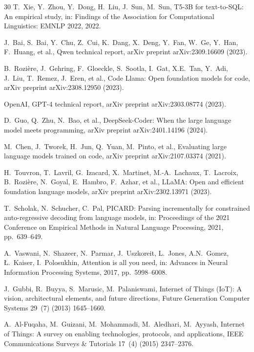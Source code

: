 \documentclass[preprint,12pt,a4paper]{elsarticle}
\begin{document}
\begin{thebibliography}{30}
T.~Xie, Y.~Zhou, Y.~Dong, H.~Liu, J.~Sun, M.~Sun,
{T5}-3B for text-to-{SQL}: An empirical study,
in: Findings of the Association for Computational Linguistics: {EMNLP} 2022, 2022.

J.~Bai, S.~Bai, Y.~Chu, Z.~Cui, K.~Dang, X.~Deng, Y.~Fan, W.~Ge, Y.~Han, F.~Huang, et al.,
{Qwen} technical report,
arXiv preprint arXiv:2309.16609 (2023).

B.~Rozi\`ere, J.~Gehring, F.~Gloeckle, S.~Sootla, I.~Gat, X.E.~Tan, Y.~Adi, J.~Liu, T.~Remez, J.~Eren, et al.,
Code {Llama}: Open foundation models for code,
arXiv preprint arXiv:2308.12950 (2023).

{OpenAI},
{GPT}-4 technical report,
arXiv preprint arXiv:2303.08774 (2023).

D.~Guo, Q.~Zhu, N.~Bao, et al.,
{DeepSeek-Coder}: When the large language model meets programming,
arXiv preprint arXiv:2401.14196 (2024).

M.~Chen, J.~Tworek, H.~Jun, Q.~Yuan, M.~Pinto, et al.,
Evaluating large language models trained on code,
arXiv preprint arXiv:2107.03374 (2021).

H.~Touvron, T.~Lavril, G.~Izacard, X.~Martinet, M.-A.~Lachaux, T.~Lacroix, B.~Rozi\`ere, N.~Goyal, E.~Hambro, F.~Azhar, et al.,
{LLaMA}: Open and efficient foundation language models,
arXiv preprint arXiv:2302.13971 (2023).

T.~Scholak, N.~Schucher, C.~Pal,
{PICARD}: Parsing incrementally for constrained auto-regressive decoding from language models,
in: Proceedings of the 2021 Conference on Empirical Methods in Natural Language Processing, 2021, pp.~639--649.

A.~Vaswani, N.~Shazeer, N.~Parmar, J.~Uszkoreit, L.~Jones, A.N.~Gomez, {\L}.~Kaiser, I.~Polosukhin,
Attention is all you need,
in: Advances in Neural Information Processing Systems, 2017, pp.~5998--6008.

J.~Gubbi, R.~Buyya, S.~Marusic, M.~Palaniswami,
Internet of Things ({IoT}): A vision, architectural elements, and future directions,
Future Generation Computer Systems 29~(7) (2013) 1645--1660.

A.~Al-Fuqaha, M.~Guizani, M.~Mohammadi, M.~Aledhari, M.~Ayyash,
Internet of Things: A survey on enabling technologies, protocols, and applications,
{IEEE} Communications Surveys \& Tutorials 17~(4) (2015) 2347--2376.


\end{thebibliography}
\end{document}

